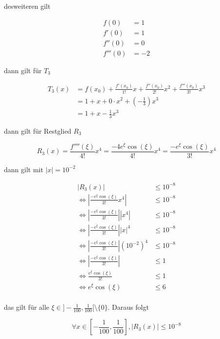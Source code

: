 \documentclass[a4paper, 11pt]{article}
\begin{document}
desweiteren gilt

\begin{align*}
    f(0)     &= 1 \\
    f'(0)    &= 1 \\
    f''(0)   &= 0 \\
    f'''(0)  &= -2
\end{align*}

dann gilt für \(T_3\)

\begin{align*}
    T_3(x) &= f(x_0) + \frac{f'(x_0)}{1!} x +
        \frac{f''(x_0)}{2!} x^2 + \frac{f'''(x_0)}{3!} x^3 \\
    &= 1 + x + 0 \cdot x^2 + (-\frac{1}{3}) x^3 \\
    &= 1 + x - \frac{1}{3} x^3
\end{align*}

dann gilt für Restglied \(R_3\)

$$ R_3(x) = \frac{f''''(\xi)}{4!} x^4 = \frac{-4 e^{\xi} \cos(\xi)}{4!} x^4
    = \frac{- e^{\xi} \cos(\xi)}{3!} x^4 $$

dann gilt mit \(|x| = 10^{-2}\)

\begin{align*}
    |R_3(x)| &\leq 10^{-8} \\
    \Leftrightarrow \left| \frac{- e^{\xi} \cos(\xi)}{3!} x^4 \right| &\leq 10^{-8} \\
    \Leftrightarrow \left| \frac{- e^{\xi} \cos(\xi)}{3!} \right| |x^4| &\leq 10^{-8} \\
    \Leftrightarrow \left| \frac{- e^{\xi} \cos(\xi)}{3!} \right| |x|^4 &\leq 10^{-8} \\
    \Leftrightarrow \left| \frac{- e^{\xi} \cos(\xi)}{3!} \right| (10^{-2})^4 &\leq 10^{-8} \\
    \Leftrightarrow \left| \frac{- e^{\xi} \cos(\xi)}{3!} \right| &\leq 1 \\
    \Leftrightarrow \frac{e^{\xi} \cos(\xi)}{3!} &\leq 1 \\
    \Leftrightarrow e^{\xi} \cos(\xi) &\leq 6 \\
\end{align*}

das gilt für alle \(\xi \in ]-\frac{1}{100}, \frac{1}{100}[ \setminus \{0\}\). Daraus folgt

$$ \forall x \in [-\frac{1}{100}, \frac{1}{100}], |R_3(x)| \leq 10^{-8} $$
\end{document}
